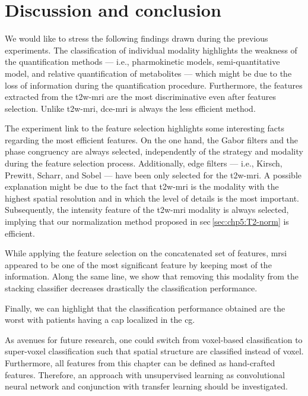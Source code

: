 \section{Discussion and conclusion}\label{sec:chp6:discussion}

We would like to stress the following findings drawn during the previous experiments.
The classification of individual modality highlights the weakness of the quantification methods --- i.e., pharmokinetic models, semi-quantitative model, and relative quantification of metabolites --- which might be due to the loss of information during the quantification procedure.
Furthermore, the features extracted from the \ac{t2w}-\ac{mri} are the most discriminative even after features selection.
Unlike \ac{t2w}-\ac{mri}, \ac{dce}-\ac{mri} is always the less efficient method.

The experiment link to the feature selection highlights some interesting facts regarding the most efficient features.
On the one hand, the Gabor filters and the phase congruency are always selected, independently of the strategy and modality during the feature selection process.
Additionally, edge filters --- i.e., Kirsch, Prewitt, Scharr, and Sobel --- have been only selected for the \ac{t2w}-\ac{mri}.
A possible explanation might be due to the fact that \ac{t2w}-\ac{mri} is the modality with the highest spatial resolution and in which the level of details is the most important.
Subsequently, the intensity feature of the \ac{t2w}-\ac{mri} modality is always selected, implying that our normalization method proposed in \acs{sec}\,\ref{sec:chp5:T2-norm} is efficient.

While applying the feature selection on the concatenated set of features, \ac{mrsi} appeared to be one of the most significant feature by keeping most of the information.
Along the same line, we show that removing this modality from the stacking classifier decreases drastically the classification performance.

Finally, we can highlight that the classification performance obtained are the worst with patients having a \ac{cap} localized in the \ac{cg}. 

As avenues for future research, one could switch from voxel-based classification to super-voxel classification such that spatial structure are classified instead of voxel.
Furthermore, all features from this chapter can be defined as hand-crafted features.
Therefore, an approach with unsupervised learning as convolutional neural network and conjunction with transfer learning should be investigated.

